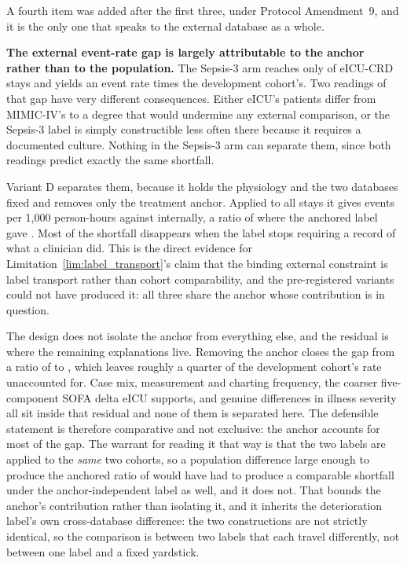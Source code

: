 A fourth item was added after the first three, under Protocol Amendment~9, and
it is the only one that speaks to the external database as a whole.

\textbf{The external event-rate gap is largely attributable to the anchor
rather than to the population.} The Sepsis-3 arm reaches only \pcExtNMicroStays{} of
\pcExtAltNStays{} eICU-CRD stays and yields an event rate
\pcExtRateRatioB{} times the development cohort's. Two readings of that gap
have very different consequences. Either eICU's patients differ from
MIMIC-IV's to a degree that would undermine any external comparison, or the
Sepsis-3 label is simply constructible less often there because it requires a
documented culture. Nothing in the Sepsis-3 arm can separate them, since both
readings predict exactly the same shortfall.

Variant D separates them, because it holds the physiology and the two databases
fixed and removes only the treatment anchor. Applied to all \pcExtAltNStays{}
stays it gives \pcExtAltRateEicu{} events per 1{,}000 person-hours against
\pcExtAltRateMimic{} internally, a ratio of \pcExtAltRateRatio{} where the
anchored label gave \pcExtRateRatioB. Most of the shortfall disappears when the
label stops requiring a record of what a clinician did. This is the direct
evidence for Limitation~\ref{lim:label_transport}'s claim that the binding
external constraint is label transport rather than cohort comparability, and
the pre-registered variants could not have produced it: all three share the
anchor whose contribution is in question.

The design does not isolate the anchor from everything else, and the residual
is where the remaining explanations live. Removing the anchor closes the gap
from a ratio of \pcExtRateRatioB{} to \pcExtAltRateRatio, which leaves roughly
a quarter of the development cohort's rate unaccounted for. Case mix,
measurement and charting frequency, the coarser five-component SOFA delta eICU
supports, and genuine differences in illness severity all sit inside that
residual and none of them is separated here. The defensible statement is
therefore comparative and not exclusive: the anchor accounts for most of the
gap. The warrant for reading it that way is that the two labels are applied to
the \emph{same} two cohorts, so a population difference large enough to produce
the anchored ratio of \pcExtRateRatioB{} would have had to produce a comparable
shortfall under the anchor-independent label as well, and it does not. That
bounds the anchor's contribution rather than isolating it, and it inherits the
deterioration label's own cross-database difference: the two constructions are
not strictly identical, so the comparison is between two labels that each
travel differently, not between one label and a fixed yardstick.

